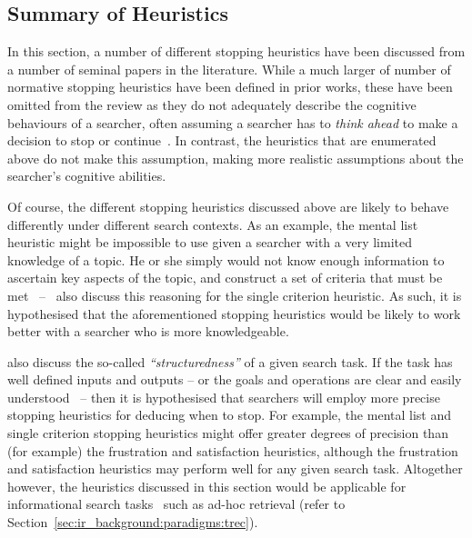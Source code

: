 \subsection{Summary of Heuristics}
In this section, a number of different stopping heuristics have been discussed from a number of seminal papers in the literature. While a much larger of number of normative stopping heuristics have been defined in prior works, these have been omitted from the review as they do not adequately describe the cognitive behaviours of a searcher, often assuming a searcher has to \emph{think ahead} to make a decision to stop or continue~\citep{browne2004stopping_rules}. In contrast, the heuristics that are enumerated above do not make this assumption, making more realistic assumptions about the searcher's cognitive abilities.

Of course, the different stopping heuristics discussed above are likely to behave differently under different search contexts. As an example, the mental list heuristic might be impossible to use given a searcher with a very limited knowledge of a topic. He or she simply would not know enough information to ascertain key aspects of the topic, and construct a set of criteria that must be met~\citep{browne2005stopping_rules} --~\cite{gigerenzer1999betting} also discuss this reasoning for the single criterion heuristic. As such, it is hypothesised that the aforementioned stopping heuristics would be likely to work better with a searcher who is more knowledgeable.


\cite{browne2005stopping_rules} also discuss the so-called \emph{``structuredness''} of a given search task. If the task has well defined inputs and outputs -- or the goals and operations are clear and easily understood~\citep{simon1996sciences} -- then it is hypothesised that searchers will employ more precise stopping heuristics for deducing when to stop. For example, the mental list and single criterion stopping heuristics might offer greater degrees of precision than (for example) the frustration and satisfaction heuristics, although the frustration and satisfaction heuristics may perform well for any given search task. Altogether however, the heuristics discussed in this section would be applicable for informational search tasks~\citep{browne2005stopping_rules} such as ad-hoc retrieval (refer to Section~\ref{sec:ir_background:paradigms:trec}).

